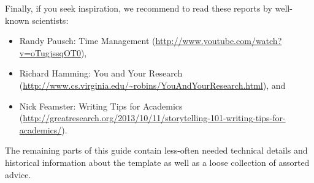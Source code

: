 Finally, if you seek inspiration, we recommend to read these reports by well-known scientists:
\begin{itemize}
\item Randy Pausch: Time Management (\url{http://www.youtube.com/watch?v=oTugjssqOT0}),
\item Richard Hamming: You and Your Research (\url{http://www.cs.virginia.edu/~robins/YouAndYourResearch.html}), and
\item Nick Feamster: Writing Tips for Academics (\url{http://greatresearch.org/2013/10/11/storytelling-101-writing-tips-for-academics/}).
\end{itemize}

The remaining parts of this guide contain less-often needed technical details and historical information about the template as well as a loose collection of assorted advice.